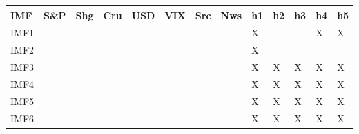 {\tiny\setlength{\tabcolsep}{1pt}\begin{tabular}{lllllllllllll} \toprule
IMF & S\&P & Shg & Cru & USD & VIX & Src & Nws & h1 & h2 & h3 & h4 & h5 \\ \midrule
IMF1 & & & & & & & & X & & & X & X \\ 
IMF2 & & & & & & & & X & & & & \\ 
IMF3 & & & & & & & & X & X & X & X & X \\ 
IMF4 & & & & & & & & X & X & X & X & X \\ 
IMF5 & & & & & & & & X & X & X & X & X \\ 
IMF6 & & & & & & & & X & X & X & X & X \\ 
\bottomrule \end{tabular}}